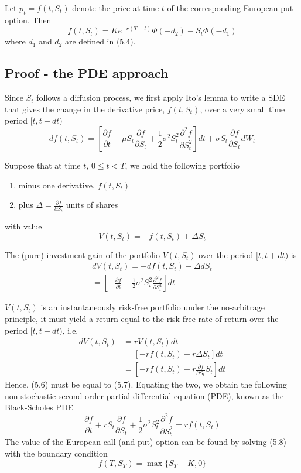 \documentclass[11pt,a4paper]{book}
\theoremstyle{definition}\newtheorem{definition}{Definition}
\theoremstyle{definition}\newtheorem{fact}{Fact}
\theoremstyle{definition}\newtheorem{remark}{Remark}
\theoremstyle{definition}\newtheorem{ex}{Ex.}
\theoremstyle{definition}\newtheorem{project}{Project}
\theoremstyle{definition}\newtheorem{problem}{Problem}
\theoremstyle{definition}\newtheorem{example}{Example}
\numberwithin{theorem}{section}
\numberwithin{corollary}{chapter}
\numberwithin{assumption}{chapter}
\numberwithin{definition}{chapter}
\numberwithin{prop}{chapter}
\numberwithin{notation}{chapter}
\numberwithin{problem}{chapter}
\numberwithin{example}{chapter}
\numberwithin{fact}{chapter}
\numberwithin{ex}{chapter}
\begin{document}
Let $p_t = f(t, S_t)$ denote the price at time $t$ of the corresponding European put option. Then
$$ f(t,S_t) = Ke^{-r(T-t)}\Phi(-d_2) - S_t \Phi(-d_1) $$
where $d_1$ and $d_2$ are defined in (5.4).

\subsection{Proof - the PDE approach}

Since $S_t$ follows a diffusion process, we first apply Ito's lemma to write a SDE that gives the change in the derivative price, $f(t, S_t)$, over a very small time period $[t, t + dt)$
\begin{equation}
df(t,S_t) = \left[ \frac{\partial f}{\partial t} + \mu S_t \frac{\partial f}{\partial S_t} + \frac{1}{2} \sigma^2 S_t^2 \frac{\partial^2 f}{\partial S_t^2} \right] dt + \sigma S_t \frac{\partial f}{\partial S_t} dW_t
\end{equation}

Suppose that at time $t$, $0 \leq t < T$, we hold the following portfolio
\begin{enumerate}
\item minus one derivative, $f(t, S_t)$
\item plus $\Delta = \frac{\partial f}{\partial S_t}$ units of shares
\end{enumerate}
with value
$$ V(t,S_t) = -f(t,S_t) + \Delta S_t $$

The (pure) investment gain of the portfolio $V(t, S_t)$ over the period $[t, t+dt)$ is
\begin{align}
dV(t,S_t) = -df(t,S_t) + \Delta dS_t \\ \nonumber
= \left[ -\frac{\partial f}{\partial t} - \frac{1}{2} \sigma^2 S_t^2 \frac{\partial^2 f}{\partial S_t^2} \right] dt
\end{align}

$V(t, S_t)$ is an instantaneously risk-free portfolio under the no-arbitrage principle, it must yield a return equal to the risk-free rate of return over the period $[t, t+dt)$, i.e.
\begin{align}
dV(t,S_t) &= rV(t,S_t)dt \\ \nonumber
&= [-rf(t,S_t) + r \Delta S_t ] dt \\ \nonumber
&= \left[ -r f(t,S_t) + r\frac{\partial f}{\partial S_t}S_t \right] dt
\end{align}
Hence, (5.6) must be equal to (5.7). Equating the two, we obtain the following non-stochastic second-order partial differential equation (PDE), known as the Black-Scholes PDE
\begin{equation}
\frac{\partial f}{\partial t} + rS_t \frac{\partial f}{\partial S_t} + \frac{1}{2} \sigma^2 S_t^2 \frac{\partial^2 f}{\partial S_t^2} = rf(t,S_t)
\end{equation}
The value of the European call (and put) option can be found by solving (5.8) with the boundary condition
\begin{equation}
f(T,S_T) = \max \{S_T - K,0\}
\end{equation}
\end{document}
